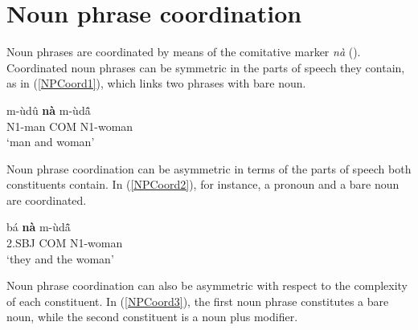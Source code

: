 












\section{Noun phrase coordination}
\label{sec:NPCoord}

Noun phrases are coordinated by means of the comitative marker {\itshape nà} (). Coordinated noun phrases can be symmetric in the parts of speech they contain, as in (\ref{NPCoord1}), which links two phrases with bare noun.

\begin{exe}
\ex\label{NPCoord1} 
 \gll  m-ùdû {\bfseries nà} m-ùdã̂ \\
            N1-man COM N1-woman \\
    \trans `man and woman'
\end{exe}

Noun phrase coordination can be asymmetric in terms of the parts of speech both constituents contain. In (\ref{NPCoord2}), for instance, a pronoun and a bare noun are coordinated.

\begin{exe}
\ex\label{NPCoord2} 
 \gll  bá {\bfseries nà} m-ùdã̂ \\
            2.SBJ COM N1-woman \\
    \trans `they and the woman'
\end{exe}

Noun phrase coordination can also be asymmetric with respect to the complexity of each constituent. In (\ref{NPCoord3}), the first noun phrase constitutes a bare noun, while the second constituent is a noun plus modifier.


